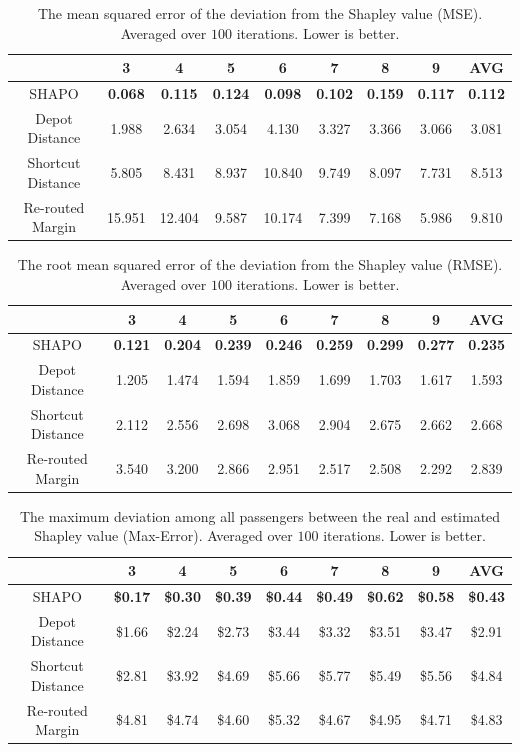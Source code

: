 \documentclass[sigconf]{aamas}
\begin{document}
\begin{table}
\centering
\begin{tabular}{ c|c c c c c c c c } 
\hline
 & 3 & 4 & 5 & 6 & 7 & 8 & 9 & AVG\\
 \hline
SHAPO & \textbf{0.068} & \textbf{0.115} & \textbf{0.124} & \textbf{0.098} & \textbf{0.102} & \textbf{0.159} & \textbf{0.117} & \textbf{0.112}\\
Depot Distance & 1.988 & 2.634 & 3.054 & 4.130 & 3.327 & 3.366 & 3.066 & 3.081\\
Shortcut Distance & 5.805 & 8.431 & 8.937 & 10.840 & 9.749 & 8.097 & 7.731 & 8.513\\
Re-routed Margin & 15.951 & 12.404 & 9.587 & 10.174 & 7.399 & 7.168 & 5.986 & 9.810\\
 \hline
\end{tabular}
\caption{The mean squared error of the deviation from the Shapley value (MSE). Averaged over $100$ iterations. Lower is better.}
\label{tab:PowTable}
\end{table}


\begin{table}
\centering
\begin{tabular}{ c|c c c c c c c c } 
\hline
 & 3 & 4 & 5 & 6 & 7 & 8 & 9 & AVG\\
 \hline
SHAPO & \textbf{0.121} & \textbf{0.204} & \textbf{0.239} & \textbf{0.246} & \textbf{0.259} & \textbf{0.299} & \textbf{0.277} & \textbf{0.235}\\
Depot Distance & 1.205 & 1.474 & 1.594 & 1.859 & 1.699 & 1.703 & 1.617 & 1.593\\
Shortcut Distance & 2.112 & 2.556 & 2.698 & 3.068 & 2.904 & 2.675 & 2.662 & 2.668\\
Re-routed Margin & 3.540 & 3.200 & 2.866 & 2.951 & 2.517 & 2.508 & 2.292 & 2.839\\
 \hline
\end{tabular}
\caption{The root mean squared error of the deviation from the Shapley value (RMSE). Averaged over $100$ iterations. Lower is better.}
\label{tab:RMSETable}
\end{table}


\begin{table}[!h]
\centering
\begin{tabular}{ c|c c c c c c c c } 
\hline
 & 3 & 4 & 5 & 6 & 7 & 8 & 9 & AVG\\
 \hline
SHAPO & \textbf{\$0.17} & \textbf{\$0.30} & \textbf{\$0.39} & \textbf{\$0.44} & \textbf{\$0.49} & \textbf{\$0.62} & \textbf{\$0.58} & \textbf{\$0.43}\\
Depot Distance & \$1.66 & \$2.24 & \$2.73 & \$3.44 & \$3.32 & \$3.51 & \$3.47 & \$2.91\\
Shortcut Distance & \$2.81 & \$3.92 & \$4.69 & \$5.66 & \$5.77 & \$5.49 & \$5.56 & \$4.84\\
Re-routed Margin & \$4.81 & \$4.74 & \$4.60 & \$5.32 & \$4.67 & \$4.95 & \$4.71 & \$4.83\\
 \hline
\end{tabular}
\caption{The maximum deviation among all passengers between the real and estimated Shapley value (Max-Error). Averaged over $100$ iterations. Lower is better.}
\label{tab:MAXTable}
\end{table}
\egroup
\end{document}

